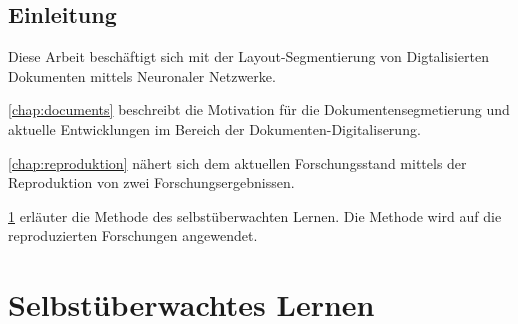 

\section*{Einleitung}
Diese Arbeit beschäftigt sich mit der Layout-Segmentierung von Digtalisierten Dokumenten mittels Neuronaler Netzwerke.

\cref{chap:documents} beschreibt die Motivation für die Dokumentensegmetierung und aktuelle Entwicklungen im
Bereich der Dokumenten-Digitaliserung.

\cref{chap:reproduktion} nähert sich dem aktuellen Forschungsstand mittels der Reproduktion von zwei Forschungsergebnissen.

\cref{chap:selfsupervised} erläuter die Methode des selbstüberwachten Lernen. Die Methode wird auf die reproduzierten Forschungen angewendet.




\chapter{Selbstüberwachtes Lernen}
\label{chap:selfsupervised}

